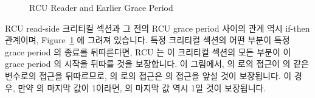 \begin{figure}[tb]
\centering
{}
\caption{RCU Reader and Earlier Grace Period}
\label{fig:defer:RCU Reader and Earlier Grace Period}
\end{figure}

RCU read-side 크리티컬 섹션과 그 전의 RCU grace period 사이의 관계 역시 if-then
관계이며,
Figure~\ref{fig:defer:RCU Reader and Earlier Grace Period} 에 그려져 있습니다.
특정 크리티컬 섹션의 어떤 부분이 특정 grace period 의 종료를 뒤따른다면, RCU 는
이 크리티컬 섹션의 모든 부분이 이 grace period 의 시작을 뒤따를 것을
보장합니다.
이 그림에서,  의  로의 접근이  의 같은 변수로의 접근을
뒤따르므로,  의  로의 접근은  의 접근을 앞설 것이
보장됩니다.
이 경우, 만약  의 마지막 값이 1이라면,  의 마지막 값 역시 1일 것이
보장됩니다.

